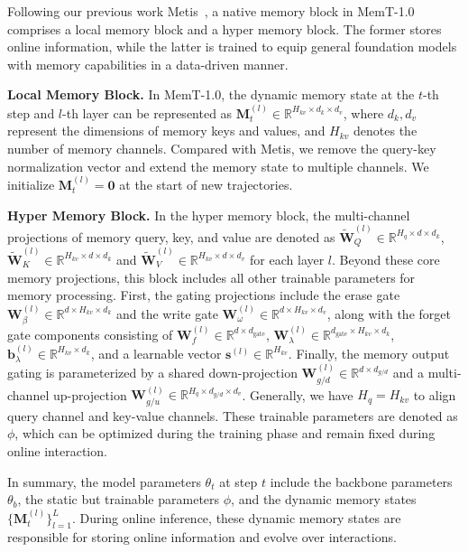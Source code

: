Following our previous work Metis~\cite{zhang2026metis}, a native memory block in MemT-1.0 comprises a local memory block and a hyper memory block.
The former stores online information, while the latter is trained to equip general foundation models with memory capabilities in a data-driven manner.

\textbf{Local Memory Block.}
In MemT-1.0, the dynamic memory state at the $t$-th step and $l$-th layer can be represented as $\mathbf{M}_t^{(l)} \in \mathbb{R}^{H_{kv} \times d_k \times d_v}$, where $d_k, d_v$ represent the dimensions of memory keys and values, and $H_{kv}$ denotes the number of memory channels.
Compared with Metis, we remove the query-key normalization vector and extend the memory state to multiple channels. 
We initialize $\mathbf{M}_t^{(l)} = \mathbf{0}$ at the start of new trajectories.

\textbf{Hyper Memory Block.}
In the hyper memory block, the multi-channel projections of memory query, key, and value are denoted as $\tilde{\mathbf{W}}_Q^{(l)} \in \mathbb{R}^{H_{q} \times d \times d_k}$, $\tilde{\mathbf{W}}_K^{(l)} \in \mathbb{R}^{H_{kv} \times d \times d_k}$ and $\tilde{\mathbf{W}}_V^{(l)} \in \mathbb{R}^{H_{kv} \times d \times d_v}$ for each layer $l$.
Beyond these core memory projections, this block includes all other trainable parameters for memory processing.
First, the gating projections include the erase gate $\mathbf{W}_{\beta}^{(l)} \in \mathbb{R}^{d \times H_{kv} \times d_k}$ and the write gate $\mathbf{W}_{\omega}^{(l)} \in \mathbb{R}^{d \times H_{kv} \times d_v}$, along with the forget gate components consisting of $\mathbf{W}_{f}^{(l)} \in \mathbb{R}^{d \times d_{\text{gate}}}$, $\mathbf{W}_{\lambda}^{(l)} \in \mathbb{R}^{d_{\text{gate}} \times H_{kv} \times d_k}$, $\mathbf{b}_{\lambda}^{(l)} \in \mathbb{R}^{H_{kv} \times d_k}$, and a learnable vector $\mathbf{s}^{(l)} \in \mathbb{R}^{H_{kv}}$.
Finally, the memory output gating is parameterized by a shared down-projection $\mathbf{W}_{g/d}^{(l)} \in \mathbb{R}^{d \times d_{g/d}}$ and a multi-channel up-projection $\mathbf{W}_{g/u}^{(l)} \in \mathbb{R}^{H_q \times d_{g/d} \times d_v}$.
Generally, we have $H_q = H_{kv}$ to align query channel and key-value channels. 
These trainable parameters are denoted as $\phi$, which can be optimized during the training phase and remain fixed during online interaction.

In summary, the model parameters $\theta_t$ at step $t$ include the backbone parameters $\theta_b$, the static but trainable parameters $\phi$, and the dynamic memory states $\{\mathbf{M}_t^{(l)}\}_{l=1}^{L}$.
During online inference, these dynamic memory states are responsible for storing online information and evolve over interactions.

